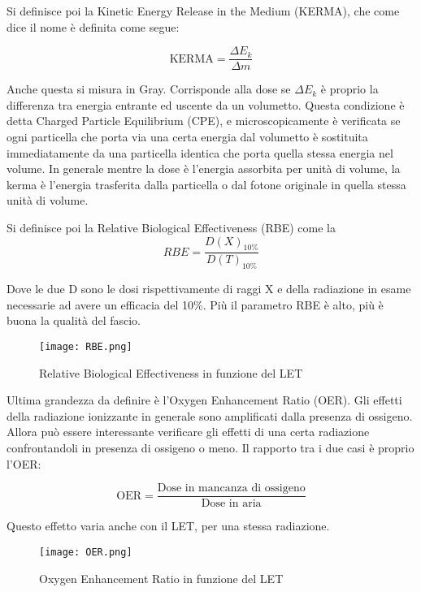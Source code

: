 \documentclass [a4paper, twoside] {book}
\begin{document}
Si definisce poi la Kinetic Energy Release in the Medium (KERMA), che come dice il nome è definita come segue:

\begin{equation}
\text{KERMA}=\frac{\Delta E_k}{\Delta m}
\end{equation}

Anche questa si misura in Gray. Corrisponde alla dose se $\Delta E_k$ è proprio la differenza tra energia entrante ed uscente da un volumetto.
Questa condizione è detta Charged Particle Equilibrium (CPE), e microscopicamente è verificata se ogni particella che porta via una certa energia dal volumetto è sostituita immediatamente da una particella identica che porta quella stessa energia nel volume. 
In generale mentre la dose è l'energia assorbita per unità di volume, la kerma è l'energia trasferita dalla particella o dal fotone originale in quella stessa unità di volume.

Si definisce poi la Relative Biological Effectiveness (RBE) come la
\begin{equation}
RBE=\frac{D(X)_{10\%}}{D(T)_{10\%}}
\end{equation}

Dove le due D sono le dosi rispettivamente di raggi X e della radiazione in esame necessarie ad avere un efficacia del 10\%. Più il parametro RBE è alto, più è buona la qualità del fascio.

\begin{figure} []
\centering
		\texttt{[image: RBE.png]}
		\caption{Relative Biological Effectiveness in funzione del LET}
         \label{RBE}
\end{figure}

Ultima grandezza da definire è l'Oxygen Enhancement Ratio (OER). Gli effetti della radiazione ionizzante in generale sono amplificati dalla presenza di ossigeno. Allora può essere interessante verificare gli effetti di una certa radiazione confrontandoli in presenza di ossigeno o meno. Il rapporto tra i due casi è proprio l'OER:

\begin{equation}
\text{OER}=\frac{\text{Dose in mancanza di ossigeno}}{\text{Dose in aria}}
\end{equation}

Questo effetto varia anche con il LET, per una stessa radiazione.

\begin{figure} []
\centering
		\texttt{[image: OER.png]}
		\caption{Oxygen Enhancement Ratio in funzione del LET}
         \label{OER}
\end{figure}
\end{document}
